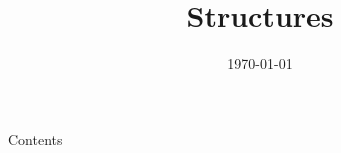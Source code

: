 
\newcommand{\topic}{
	Structures
}

\title{\topic}
\supertitle{\course}
\date{\today}



\maketitle

\begin{frame}{Contents}
	\tableofcontents
\end{frame}




